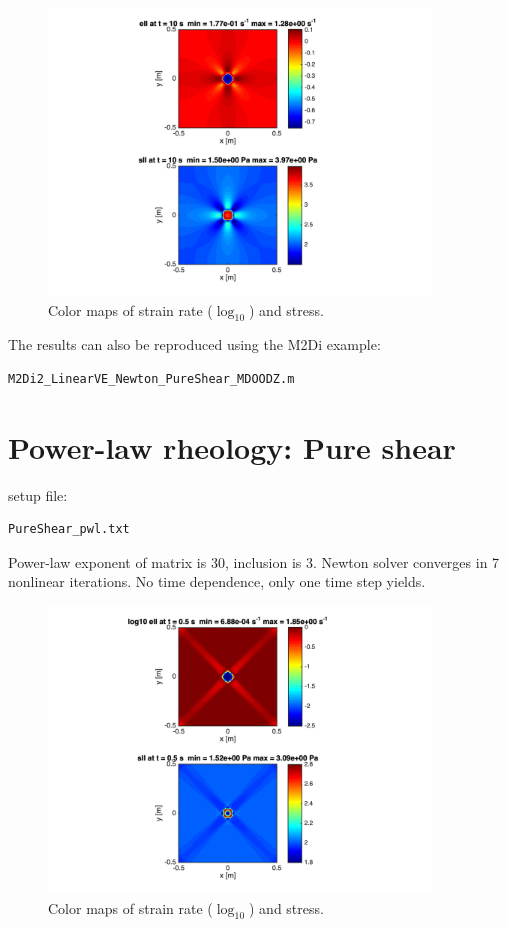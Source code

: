 \documentclass[12pt,english,openany]{scrbook}
\begin{document}
\begin{figure}[ht!]
\centerline{\includegraphics[height=3.0in]{./Figures/PureShear_VE_cmaps}}
\caption{Color maps of strain rate ($\log_{10}$) and stress.}
\label{PureShear_VE_cmapsl}
\end{figure}

The results can also be reproduced using the M2Di example:
\begin{verbatim} 
M2Di2_LinearVE_Newton_PureShear_MDOODZ.m
\end{verbatim}

\section{Power-law rheology: Pure shear}

setup file:
\begin{verbatim} 
PureShear_pwl.txt
\end{verbatim}

Power-law exponent of matrix is 30, inclusion is 3.
Newton solver converges in 7 nonlinear iterations.
No time dependence, only one time step yields.

\begin{figure}[ht!]
\centerline{\includegraphics[height=3.0in]{./Figures/PureShear_pwl_cmaps}}
\caption{Color maps of strain rate ($\log_{10}$) and stress.}
\label{PureShear_pwl_cmaps}
\end{figure}
\end{document}
